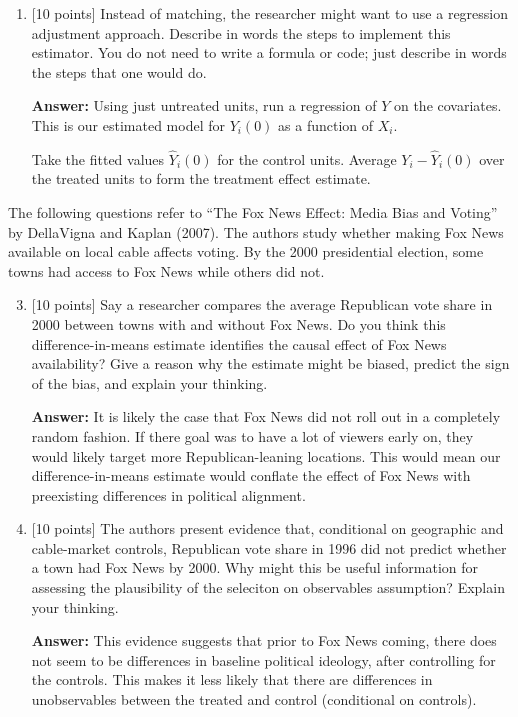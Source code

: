 \documentclass[12pt]{article}
\newcommand{\answer}[1]{{\color{blue_winged_teal}\textbf{Answer:} #1}}
\newcommand{\pts}[1]{{\color{zinc500}[#1 points]}}
\begin{document}
\begin{enumerate}
\begin{enumerate}[label=(\alph*)]
    \item \pts{10} Instead of matching, the researcher might want to use a regression adjustment approach. 
    Describe in words the steps to implement this estimator. 
    You do not need to write a formula or code; just describe in words the steps that one would do.

    \answer{
      Using just untreated units, run a regression of $Y$ on the covariates. 
      This is our estimated model for $Y_i(0)$ as a function of $X_i$. 

      Take the fitted values $\hat{Y}_i(0)$ for the control units.
      Average $Y_i - \hat{Y}_i(0)$ over the treated units to form the treatment effect estimate.
    }
  \end{enumerate}
\end{enumerate}

\newpage
\noindent
The following questions refer to ``The Fox News Effect: Media Bias and Voting'' by DellaVigna and Kaplan (2007).
The authors study whether making Fox News available on local cable affects voting.
By the 2000 presidential election, some towns had access to Fox News while others did not.

\medskip
\begin{enumerate}
  \setcounter{enumi}{2}
  \item \pts{10} Say a researcher compares the average Republican vote share in 2000 between towns with and without Fox News.
  Do you think this difference-in-means estimate identifies the causal effect of Fox News availability?
  Give a reason why the estimate might be biased, predict the sign of the bias, and explain your thinking.

  \answer{
    It is likely the case that Fox News did not roll out in a completely random fashion. 
    If there goal was to have a lot of viewers early on, they would likely target more Republican-leaning locations. 
    This would mean our difference-in-means estimate would conflate the effect of Fox News with preexisting differences in political alignment.
  }

  \medskip
  \item \pts{10} The authors present evidence that, conditional on geographic and cable-market controls, Republican vote share in 1996 did not predict whether a town had Fox News by 2000.
  Why might this be useful information for assessing the plausibility of the seleciton on observables assumption?
  Explain your thinking.

  \answer{
    This evidence suggests that prior to Fox News coming, there does not seem to be differences in baseline political ideology, after controlling for the controls.
    This makes it less likely that there are differences in unobservables between the treated and control (conditional on controls).
  }
\end{enumerate}
\end{document}
